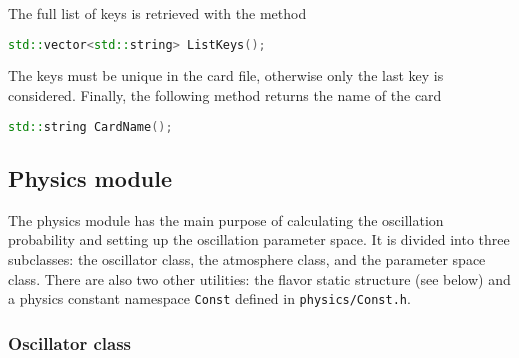 \documentclass[a4paper, 11pt]{article}
\begin{document}
The full list of keys is retrieved with the method
\begin{lstlisting}[language=C++]
    std::vector<std::string> ListKeys();
\end{lstlisting}
The keys must be unique in the card file, otherwise only the last key is considered.
Finally, the following method returns the name of the card
\begin{lstlisting}[language=C++]
    std::string CardName();
\end{lstlisting}


\subsection{Physics module}
\label{sec:physics}

The physics module has the main purpose of calculating the oscillation probability and setting up the oscillation parameter space.
It is divided into three subclasses: the oscillator class, the atmosphere class, and the parameter space class.
There are also two other utilities: the flavor static structure (see below) %
and a physics constant namespace \texttt{Const} defined in \texttt{physics/Const.h}.

\subsubsection{Oscillator class}
\label{sec:oscillator}
\end{document}
